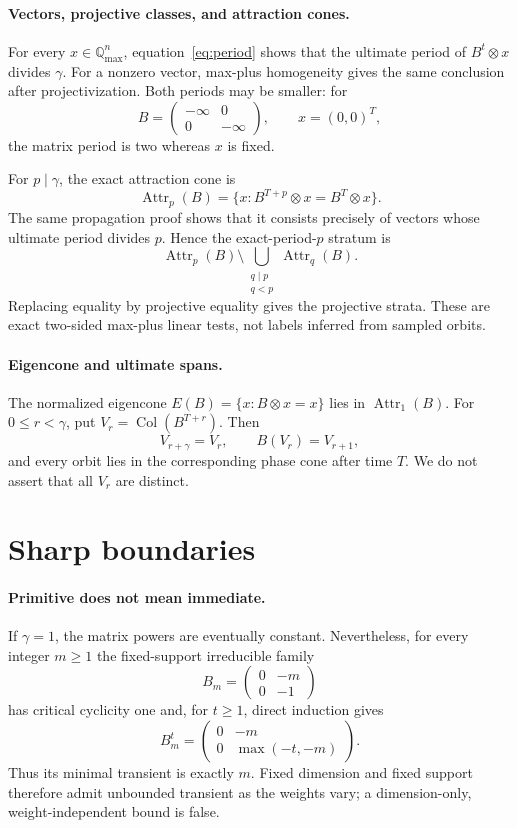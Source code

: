\documentclass[9pt]{extarticle}
\newcommand{\Rmax}{\mathbb{Q}_{\max}}
\begin{document}
\paragraph{Vectors, projective classes, and attraction cones.}
For every $x\in\Rmax^n$, equation~\eqref{eq:period} shows that the ultimate
period of $B^t\otimes x$ divides $\gamma$.  For a nonzero vector, max-plus
homogeneity gives the same conclusion after projectivization.  Both periods
may be smaller: for
\[
 B=\begin{pmatrix}-\infty&0\\0&-\infty\end{pmatrix},
 \qquad x=(0,0)^T,
\]
the matrix period is two whereas $x$ is fixed.

For $p\mid\gamma$, the exact attraction cone is
\[
 \operatorname{Attr}_p(B)
 =\{x:B^{T+p}\otimes x=B^T\otimes x\}.
\]
The same propagation proof shows that it consists precisely of vectors whose
ultimate period divides $p$.  Hence the exact-period-$p$ stratum is
\[
 \operatorname{Attr}_p(B)\setminus
 \bigcup_{\substack{q\mid p\\q<p}}\operatorname{Attr}_q(B).
\]
Replacing equality by projective equality gives the projective strata.  These
are exact two-sided max-plus linear tests, not labels inferred from sampled
orbits.

\paragraph{Eigencone and ultimate spans.}
The normalized eigencone $E(B)=\{x:B\otimes x=x\}$ lies in
$\operatorname{Attr}_1(B)$.  For $0\le r<\gamma$, put
$V_r=\operatorname{Col}(B^{T+r})$.  Then
\[
 V_{r+\gamma}=V_r,\qquad B(V_r)=V_{r+1},
\]
and every orbit lies in the corresponding phase cone after time $T$.  We do
not assert that all $V_r$ are distinct.

\section{Sharp boundaries}
\paragraph{Primitive does not mean immediate.}
If $\gamma=1$, the matrix powers are eventually constant.  Nevertheless, for
every integer $m\ge1$ the fixed-support irreducible family
\[
 B_m=\begin{pmatrix}0&-m\\0&-1\end{pmatrix}
\]
has critical cyclicity one and, for $t\ge1$, direct induction gives
\begin{equation}\label{eq:family}
 B_m^t=\begin{pmatrix}0&-m\\0&\max(-t,-m)\end{pmatrix}.
\end{equation}
Thus its minimal transient is exactly $m$.  Fixed dimension and fixed support
therefore admit unbounded transient as the weights vary; a dimension-only,
weight-independent bound is false.
\end{document}
